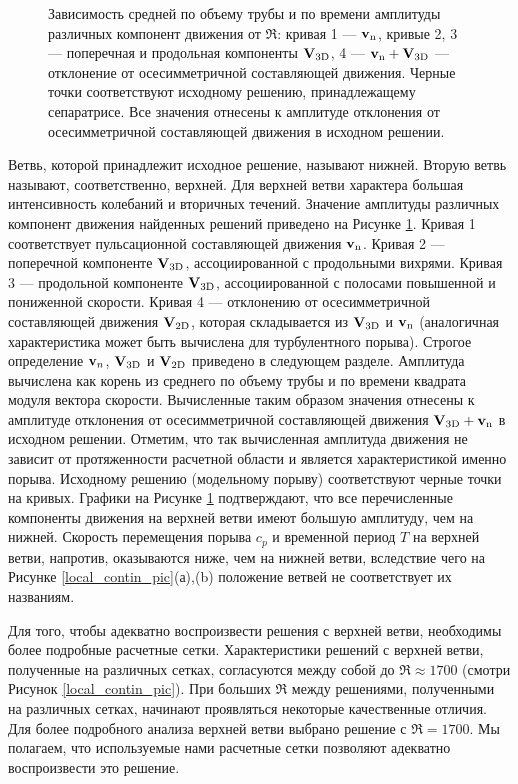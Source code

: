 \begin{figure}
\caption{Зависимость средней по объему трубы и по времени амплитуды различных компонент движения от $\Re$: кривая 1 --- $\mathbf{v}_\mathrm{n}$, кривые 2, 3 --- поперечная и продольная компоненты $\mathbf{V}_\mathrm{3D}$, 4 --- $\mathbf{v}_\mathrm{n} + \mathbf{V}_\mathrm{3D}$ --- отклонение от осесимметричной составляющей движения. Черные точки соответствуют исходному решению, принадлежащему сепаратрисе. Все значения отнесены к амплитуде отклонения от осесимметричной составляющей движения в исходном решении.}
\label{local_contin_amp_pic}
\end{figure}

Ветвь, которой принадлежит исходное решение, называют нижней. Вторую ветвь называют, соответственно, верхней. Для верхней ветви характера большая интенсивность колебаний и вторичных течений. Значение амплитуды различных компонент движения найденных решений приведено на Рисунке \ref{local_contin_amp_pic}. Кривая 1 соответствует пульсационной составляющей движения $\mathbf{v}_\mathrm{n}$. Кривая 2 --- поперечной компоненте $\mathbf{V}_\mathrm{3D}$, ассоциированной с продольными вихрями. Кривая 3 --- продольной компоненте $\mathbf{V}_\mathrm{3D}$, ассоциированной с полосами повышенной и пониженной скорости. Кривая 4 --- отклонению от осесимметричной составляющей движения $\mathbf{V}_\mathrm{2D}$, которая складывается из $\mathbf{V}_\mathrm{3D}$ и $\mathbf{v}_\mathrm{n}$ (аналогичная характеристика может быть вычислена для турбулентного порыва). Строгое определение $\mathbf{v}_n$, $\mathbf{V}_\mathrm{3D}$ и $\mathbf{V}_\mathrm{2D}$ приведено в следующем разделе. Амплитуда вычислена как корень из среднего по объему трубы и по времени квадрата модуля вектора скорости. Вычисленные таким образом значения отнесены к амплитуде отклонения от осесимметричной составляющей движения $\mathbf{V}_\mathrm{3D} + \mathbf{v}_\mathrm{n}$ в исходном решении. Отметим, что так вычисленная амплитуда движения не зависит от протяженности расчетной области и является характеристикой именно порыва. Исходному решению (модельному порыву) соответствуют черные точки на кривых. Графики на Рисунке \ref{local_contin_amp_pic} подтверждают, что все перечисленные компоненты движения на верхней ветви имеют большую амплитуду, чем на нижней. Скорость перемещения порыва $c_p$ и временной период $T$ на верхней ветви, напротив, оказываются ниже, чем на нижней ветви, вследствие чего на Рисунке \ref{local_contin_pic}(а),(b) положение ветвей не соответствует их названиям. 

Для того, чтобы адекватно воспроизвести решения с верхней ветви, необходимы более подробные расчетные сетки. Характеристики решений с верхней ветви, полученные на различных сетках, согласуются между собой до $\Re \approx 1700$ (смотри Рисунок \ref{local_contin_pic}). При больших $\Re$ между решениями, полученными на различных сетках, начинают проявляться некоторые качественные отличия. Для более подробного анализа верхней ветви выбрано решение с $\Re = 1700$. Мы полагаем, что используемые нами расчетные сетки позволяют адекватно воспроизвести это решение. 


